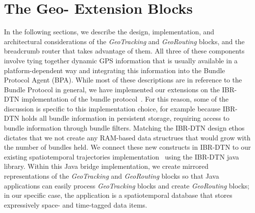 \documentclass{sig-alternate}
\begin{document}
\CopyrightYear
\crdata










%
%




%
%

\section{The Geo- Extension Blocks}
In the following sections, we describe the design, implementation, and
architectural considerations of the {\em GeoTracking} and {\em
  GeoRouting} blocks, and the {\sc breadcrumb} router that takes
advantage of them. All three of these components involve tying
together dynamic GPS information that is usually available in a
platform-dependent way and integrating this information into the
Bundle Protocol Agent (BPA). While most of these descriptions are in
reference to the Bundle Protocol in general, we have implemented our
extensions on the IBR-DTN implementation of the bundle
protocol~\cite{IBR-DTN-WASA}. For this reason, some of the discussion
is specific to this implementation choice, for example because IBR-DTN
holds all bundle information in persistent storage, requiring access
to bundle information through bundle filters. Matching the IBR-DTN
design ethos dictates that we not create any RAM-based data structrues
that would grow with the number of bundles held.  We connect these new
constructs in IBR-DTN to our existing spatiotemporal trajectories
implementation~\cite{michel12:spatiotemporal} using the IBR-DTN java
library. Within this Java bridge implementation, we create mirrored
representations of the {\em GeoTracking} and {\em GeoRouting} blocks
so that Java applications can easily process {\em GeoTracking} blocks
and create {\em GeoRouting} blocks; in our specific case, the
application is a spatiotemporal database that stores expressively
space- and time-tagged data items.
\end{document}
